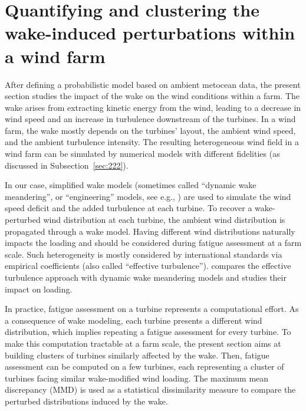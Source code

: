 \section{Quantifying and clustering the wake-induced perturbations within a wind farm}

After defining a probabilistic model based on ambient metocean data, the present section studies the impact of the wake on the wind conditions within a farm. 
The wake arises from extracting kinetic energy from the wind, leading to a decrease in wind speed and an increase in turbulence downstream of the turbines. 
In a wind farm, the wake mostly depends on the turbines' layout, the ambient wind speed, and the ambient turbulence intensity. 
The resulting heterogeneous wind field in a wind farm can be simulated by numerical models with different fidelities (as discussed in Subsection~\ref{sec:222}). 

In our case, simplified wake models (sometimes called ``dynamic wake meandering'', or ``engineering'' models, see e.g., \citealp{doubrawa_2020_benchmark}) are used to simulate the wind speed deficit and the added turbulence at each turbine.
To recover a wake-perturbed wind distribution at each turbine, the ambient wind distribution is propagated through a wake model. 
Having different wind distributions naturally impacts the loading and should be considered during fatigue assessment at a farm scale. 
Such heterogeneity is mostly considered by international standards via empirical coefficients (also called ``effective turbulence''). 
\citet{doubrawa_2023} compares the effective turbulence approach with dynamic wake meandering models and studies their impact on loading. 

In practice, fatigue assessment on a turbine represents a computational effort. 
As a consequence of wake modeling, each turbine presents a different wind distribution, which implies repeating a fatigue assessment for every turbine. 
To make this computation tractable at a farm scale, the present section aims at building clusters of turbines similarly affected by the wake. 
Then, fatigue assessment can be computed on a few turbines, each representing a cluster of turbines facing similar wake-modified wind loading. 
The maximum mean discrepancy (MMD) is used as a statistical dissimilarity measure to compare the perturbed distributions induced by the wake. 

